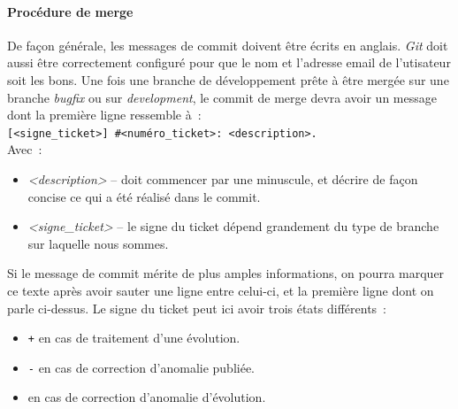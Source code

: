 \paragraph{Procédure de merge}
De façon générale, les messages de commit doivent être écrits en anglais. \emph{Git} doit aussi être correctement configuré pour que le nom et l'adresse email de l'utisateur soit les bons.
Une fois une branche de développement prête à être mergée sur une branche \emph{bugfix} ou sur \emph{development}, le commit de merge devra avoir un message dont la première ligne ressemble à~:\\
{\tt[<signe\_ticket>] \#<numéro\_ticket>: <description>.}\\
Avec~:
\begin{itemize}
	\item\emph{<description>} -- doit commencer par une minuscule, et décrire de façon concise ce qui a été réalisé dans le commit.
	\item\emph{<signe\_ticket>} -- le signe du ticket dépend grandement du type de branche sur laquelle nous sommes.
\end{itemize}
Si le message de commit mérite de plus amples informations, on pourra marquer ce texte après avoir sauter une ligne entre celui-ci, et la première ligne dont on parle ci-dessus.
	Le signe du ticket peut ici avoir trois états différents~:
		\begin{itemize}
			\item {\tt+} en cas de traitement d'une évolution.
			\item {\tt-} en cas de correction d'anomalie publiée.
			\item {\tt*} en cas de correction d'anomalie d'évolution.
		\end{itemize}

